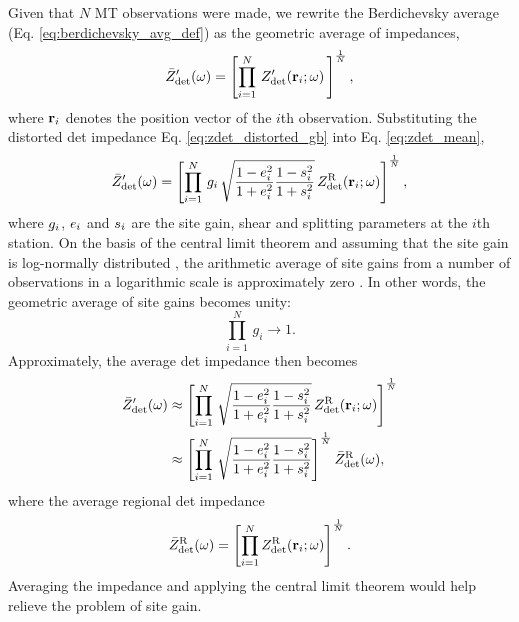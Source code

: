 	Given that $N$ MT observations were made, we rewrite the Berdichevsky average (Eq. \ref{eq:berdichevsky_avg_def}) as the geometric average of impedances, 
		\begin{equation}\label{eq:zdet_mean}
				\ZdetDistortedMean\fxomega = \left[ \prod\limits_{i=1}^{N}\, \ZdetDistorted\fxriomega\,\right ]^\frac{1}{N},
		\end{equation}
		where $\mathbf{r}_i$ denotes the position vector of the $i$th observation. 
	Substituting the distorted det impedance Eq. \eqref{eq:zdet_distorted_gb} into Eq. \eqref{eq:zdet_mean},
	\begin{equation}
		\bar{Z}'_{\mathrm{det}}(\omega) = \left[ \prod\limits_{i=1}^{N}\, g_i\,\sqrt{\frac{1-e_i^2}{1+e_i^2} \frac{1-s_i^2}{1+s_i^2}}\, Z_\text{det}^{\text{R}}(\mathbf{r}_i;\omega)\right ]^\frac{1}{N},
	\end{equation}
	where $g_i$, $e_i$ and $s_i$ are the site gain, shear and splitting parameters at the $i$th station.
	On the basis of the central limit theorem and assuming that the site gain is log-normally distributed \citep{berdichevsky1980a}, the arithmetic average of site gains from a number of observations in a logarithmic scale is approximately zero \citep[see also][]{degroot-hedlin1991a, ogawa1996a}. In other words, the geometric average of site gains becomes unity:
	\begin{equation}
		 \prod\limits_{i=1}^{N}\, g_i  \rightarrow 1.
	\end{equation}
	Approximately, the average det impedance then becomes
	\begin{equation} \label{eq:zdet_mean_apprx}
	\begin{split}
		\ZdetDistortedMean\fxomega & \approx \left[ \prod\limits_{i=1}^{N}\, \sqrt{\frac{1-\shearpi^2}{1+\shearpi^2} \frac{1-\splittingpi^2}{1+\splittingpi^2}}\, \ZdetUndistorted\fxriomega\right ]^\frac{1}{N} \\
		& \approx \left[ \prod\limits_{i=1}^{N}\, \sqrt{\frac{1-\shearpi^2}{1+\shearpi^2} \frac{1-\splittingpi^2}{1+\splittingpi^2}} \right]^\frac{1}{N} \ZdetUndistortedMean\fxomega,
	\end{split}
	\end{equation}
	where the average regional det impedance 
	\begin{equation}
		\bar{Z}_{\mathrm{det}}^{\text{R}}(\omega) = \left[ \prod\limits_{i=1}^{N}  Z_\text{det}^{\text{R}}(\mathbf{r}_i;\omega) \right]^\frac{1}{N}.
	\end{equation}
	Averaging the impedance and applying the central limit theorem would help relieve the problem of site gain.
